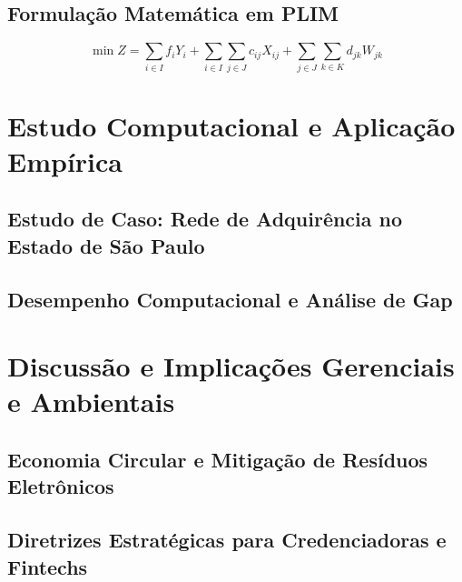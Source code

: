 \documentclass[preprint,12pt,authoryear]{elsarticle}
\begin{document}
\subsection{Formulação Matemática em PLIM}
\lipsum[49-58]

\begin{equation}
\min Z = \sum_{i \in I} f_i Y_i + \sum_{i \in I} \sum_{j \in J} c_{ij} X_{ij} + \sum_{j \in J} \sum_{k \in K} d_{jk} W_{jk}
\label{eq:objective_sample_pt}
\end{equation}

\lipsum[59-65]

\section{Estudo Computacional e Aplicação Empírica}
\label{sec:computational_study}
\subsection{Estudo de Caso: Rede de Adquirência no Estado de São Paulo}
\lipsum[66-78]

\subsection{Desempenho Computacional e Análise de Gap}
\lipsum[79-92]

\section{Discussão e Implicações Gerenciais e Ambientais}
\label{sec:discussion}
\subsection{Economia Circular e Mitigação de Resíduos Eletrônicos}
\lipsum[93-99]

\subsection{Diretrizes Estratégicas para Credenciadoras e Fintechs}
\lipsum[100-107]
\end{document}
